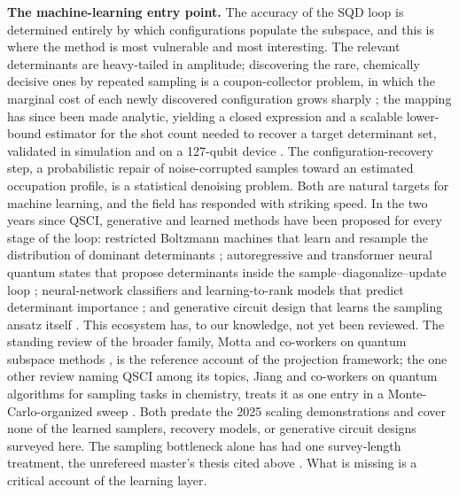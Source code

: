 \documentclass[onecolumn,a4paper]{quantumarticle}
\begin{document}
\textbf{The machine-learning entry point.} The accuracy of the SQD loop is determined entirely by which configurations populate the subspace, and this is where the method is most vulnerable and most interesting. The relevant determinants are heavy-tailed in amplitude; discovering the rare, chemically decisive ones by repeated sampling is a coupon-collector problem, in which the marginal cost of each newly discovered configuration grows sharply \cite{reinholdt2025}; the mapping has since been made analytic, yielding a closed expression and a scalable lower-bound estimator for the shot count needed to recover a target determinant set, validated in simulation and on a 127-qubit device \cite{khamadja2025}. The configuration-recovery step, a probabilistic repair of noise-corrupted samples toward an estimated occupation profile, is a statistical denoising problem. Both are natural targets for machine learning, and the field has responded with striking speed. In the two years since QSCI, generative and learned methods have been proposed for every stage of the loop: restricted Boltzmann machines that learn and resample the distribution of dominant determinants \cite{patra2025,patra2026}; autoregressive and transformer neural quantum states that propose determinants inside the sample--diagonalize--update loop \cite{chang2026,solanki2026,shang2025}; neural-network classifiers and learning-to-rank models that predict determinant importance \cite{zeni2026,zhanghaar2025,nie2026}; and generative circuit design that learns the sampling ansatz itself \cite{kemmoku2026}. This ecosystem has, to our knowledge, not yet been reviewed. The standing review of the broader family, Motta and co-workers on quantum subspace methods \cite{motta2024}, is the reference account of the projection framework; the one other review naming QSCI among its topics, Jiang and co-workers on quantum algorithms for sampling tasks in chemistry, treats it as one entry in a Monte-Carlo-organized sweep \cite{jiang2025}. Both predate the 2025 scaling demonstrations and cover none of the learned samplers, recovery models, or generative circuit designs surveyed here. The sampling bottleneck alone has had one survey-length treatment, the unrefereed master's thesis cited above \cite{khamadja2025}. What is missing is a critical account of the learning layer.
\end{document}

